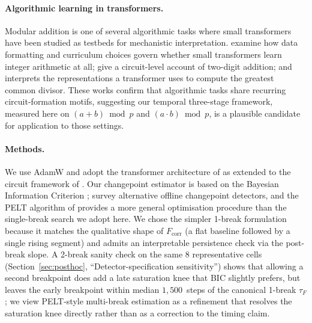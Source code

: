 \documentclass{article}
\newcommand{\tauf}{\tau_{F}}
\newcommand{\fcorr}{F_{\mathrm{corr}}}
\begin{document}
\paragraph{Algorithmic learning in transformers.}
Modular addition is one of several algorithmic tasks where
small transformers have been studied as testbeds for
mechanistic interpretation.
\citet{lee2024teaching} examine how data formatting and curriculum
choices govern whether small transformers learn integer arithmetic
at all; \citet{quirke2024understanding} give a circuit-level account
of two-digit addition; and \citet{charton2023learning} interprets
the representations a transformer uses to compute the greatest common
divisor.
These works confirm that algorithmic tasks share recurring
circuit-formation motifs, suggesting our temporal three-stage
framework, measured here on $(a+b)\bmod p$ and $(a\cdot b)\bmod p$, is
a plausible candidate for application to those settings.

\paragraph{Methods.}
We use AdamW \citep{loshchilov2019decoupled} and adopt the
transformer architecture of \citet{vaswani2017attention} as
extended to the circuit framework of \citet{elhage2021mathematical}.
Our changepoint estimator is based on the Bayesian Information
Criterion \citep{schwarz1978estimating};
\citet{truong2020selective} survey alternative offline changepoint
detectors, and the PELT algorithm of \citet{killick2012optimal}
provides a more general optimisation procedure than the single-break
search we adopt here.
We chose the simpler 1-break formulation because it matches
the qualitative shape of $\fcorr$ (a flat baseline followed by a
single rising segment) and admits an interpretable persistence
check via the post-break slope.
A 2-break sanity check on the same 8 representative cells
(Section~\ref{sec:posthoc}, ``Detector-specification sensitivity'')
shows that allowing a second breakpoint does add a late
saturation knee that BIC slightly prefers, but leaves the early
breakpoint within median $1{,}500$~steps of the canonical
1-break $\tauf$; we view PELT-style multi-break estimation as a
refinement that resolves the saturation knee directly rather
than as a correction to the timing claim.
\end{document}
